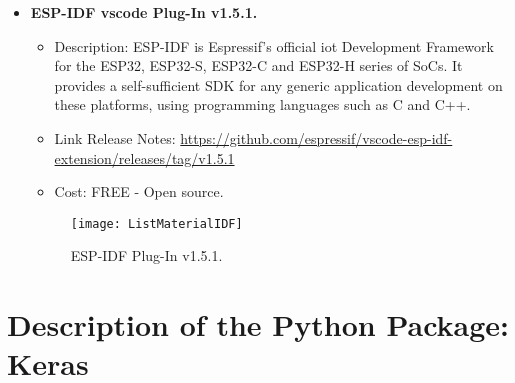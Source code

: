 \begin{itemize}
	\item \textbf{ESP-IDF \ac{vscode} Plug-In v1.5.1.} \\
	\begin{itemize}
	\item Description: ESP-IDF is Espressif's official \ac{iot} Development Framework for the ESP32, ESP32-S, ESP32-C and ESP32-H series of SoCs. It provides a self-sufficient SDK for any generic application development on these platforms, using programming languages such as C and C++.
	\item Link Release Notes: \url{https://github.com/espressif/vscode-esp-idf-extension/releases/tag/v1.5.1}
	\item Cost: FREE - Open source.
\end{itemize}
\begin{figure}  [H]
	\begin{center}
		\texttt{[image: ListMaterialIDF]}
		\caption{ESP-IDF Plug-In v1.5.1.} 
		\label{fig:ESP-IDF Plug-In v1.5.1.}
	\end{center}
\end{figure}
\end{itemize}



\section{Description of the Python Package: Keras}

